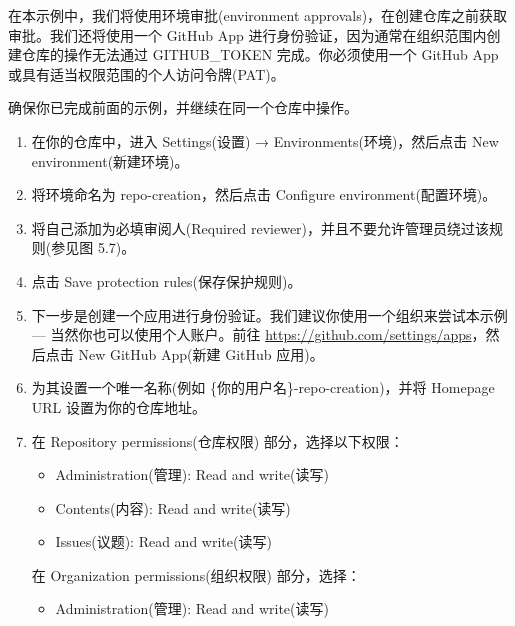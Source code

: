 在本示例中，我们将使用环境审批(environment approvals)，在创建仓库之前获取审批。我们还将使用一个 GitHub App 进行身份验证，因为通常在组织范围内创建仓库的操作无法通过 GITHUB\_TOKEN 完成。你必须使用一个 GitHub App 或具有适当权限范围的个人访问令牌(PAT)。


确保你已完成前面的示例，并继续在同一个仓库中操作。


\begin{enumerate}
\item 
在你的仓库中，进入 Settings(设置) → Environments(环境)，然后点击 New environment(新建环境)。

\item 
将环境命名为 repo-creation，然后点击 Configure environment(配置环境)。

\item 
将自己添加为必填审阅人(Required reviewer)，并且不要允许管理员绕过该规则(参见图 5.7)。


\item 
点击 Save protection rules(保存保护规则)。

\item 
下一步是创建一个应用进行身份验证。我们建议你使用一个组织来尝试本示例 --- 当然你也可以使用个人账户。前往 \url{https://github.com/settings/apps}，然后点击 New GitHub App(新建 GitHub 应用)。

\item 
为其设置一个唯一名称(例如 \{你的用户名\}-repo-creation)，并将 Homepage URL 设置为你的仓库地址。

\item 
在 Repository permissions(仓库权限) 部分，选择以下权限：

\begin{itemize}
\item 
Administration(管理): Read and write(读写)

\item 
Contents(内容): Read and write(读写)

\item 
Issues(议题): Read and write(读写)
\end{itemize}

在 Organization permissions(组织权限) 部分，选择：

\begin{itemize}
\item 
Administration(管理): Read and write(读写)
\end{itemize}


\end{enumerate}
